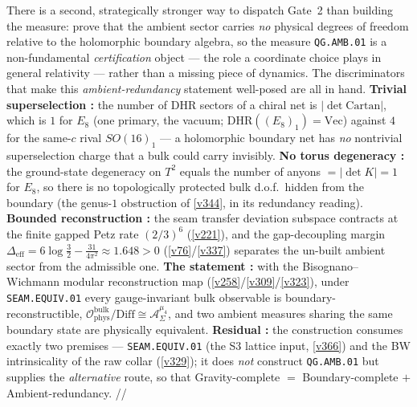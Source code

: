 \documentclass[11pt,a4paper]{article}
\begin{document}
\begin{keybox}
There is a second, strategically stronger way to dispatch Gate~2 than building the measure: prove that the
ambient sector carries \emph{no} physical degrees of freedom relative to the holomorphic boundary algebra, so the
measure \texttt{QG.AMB.01} is a non-fundamental \emph{certification} object --- the role a coordinate choice plays
in general relativity --- rather than a missing piece of dynamics. The discriminators that make this
\emph{ambient-redundancy} statement well-posed are all in hand. \textbf{Trivial superselection \mE:} the number
of DHR sectors of a chiral net is $|\det\mathrm{Cartan}|$, which is $1$ for $E_8$ (one primary, the vacuum;
$\mathrm{DHR}((E_8)_1)=\mathrm{Vec}$) against $4$ for the same-$c$ rival $SO(16)_1$ --- a holomorphic boundary net
has \emph{no} nontrivial superselection charge that a bulk could carry invisibly. \textbf{No torus degeneracy
\mE:} the ground-state degeneracy on $T^2$ equals the number of anyons $=|\det K|=1$ for $E_8$, so there is no
topologically protected bulk d.o.f.\ hidden from the boundary (the genus-$1$ obstruction of \vref{v344}, in its
redundancy reading). \textbf{Bounded reconstruction \mE:} the seam transfer deviation subspace contracts at the
finite gapped Petz rate $(2/3)^6$ (\vref{v221}), and the gap-decoupling margin
$\Delta_{\mathrm{eff}}=6\log\tfrac32-\tfrac{31}{4\pi^2}\approx1.648>0$ (\vref{v76}/\vref{v337}) separates the
un-built ambient sector from the admissible one. \textbf{The statement \mC:} with the Bisognano--Wichmann modular
reconstruction map (\vref{v258}/\vref{v309}/\vref{v323}), under \texttt{SEAM.EQUIV.01} every gauge-invariant bulk
observable is boundary-reconstructible,
$\mathcal O_{\mathrm{phys}}^{\mathrm{bulk}}/\mathrm{Diff}\cong\mathcal A_\Sigma^{\mu_4}$, and two ambient measures
sharing the same boundary state are physically equivalent. \textbf{Residual \mO:} the construction consumes
exactly two premises --- \texttt{SEAM.EQUIV.01} (the S3 lattice input, \vref{v366}) and the BW intrinsicality of
the raw collar (\vref{v329}); it does \emph{not} construct \texttt{QG.AMB.01} but supplies the \emph{alternative}
route, so that Gravity-complete $=$ Boundary-complete $+$ Ambient-redundancy. \mE/\mC/\mO
\end{keybox}
\end{document}
